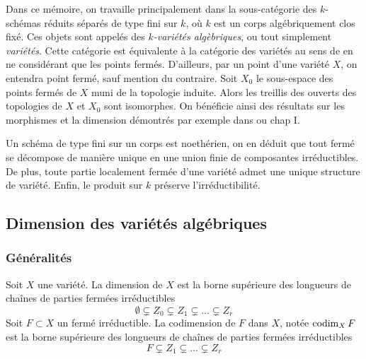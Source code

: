 Dans ce mémoire, on travaille principalement dans la sous-catégorie des $k$-schémas réduits séparés de type fini sur $k$, où $k$ est un corps algébriquement clos fixé. Ces objets sont appelés des \textit{$k$-variétés algèbriques}, ou tout simplement \textit{variétés}.  Cette catégorie est équivalente à la catégorie des variétés au sens de \cite{LAGSpringer} en ne considérant que les points fermés. D'ailleurs, par un point d'une variété $X$, on entendra point fermé, sauf mention du contraire. Soit $X_0$ le sous-espace des points fermés de $X$ muni de la topologie induite. Alors les treillis des ouverts des topologies de $X$ et $X_0$ sont isomorphes. On bénéficie ainsi des résultats sur les morphismes et la dimension démontrés par exemple dans \cite{LAGSpringer} ou \cite{MumfordRedBook} chap I.

Un schéma de type fini sur un corps est noethérien, on en déduit que tout fermé se décompose de manière unique en une union finie de composantes irréductibles. De plus, toute partie localement fermée d'une variété admet une unique structure de variété. Enfin, le produit sur $k$ préserve l'irréductibilité.

\subsection{Dimension des variétés algébriques}

\subsubsection{Généralités}

\begin{defn}
Soit $X$ une variété. La dimension de $X$ est la borne supérieure des longueurs de chaînes de parties fermées irréductibles
$$\emptyset \varsubsetneq Z_0 \varsubsetneq Z_1 \varsubsetneq ... \varsubsetneq Z_r$$
Soit $F\subset X$ un fermé irréductible. La codimension de $F$ dans $X$, notée $\operatorname{codim}_X F$ est la borne supérieure des longueurs de chaînes de parties fermées irréductibles
$$F \varsubsetneq Z_1 \varsubsetneq ... \varsubsetneq Z_r$$
\end{defn}

